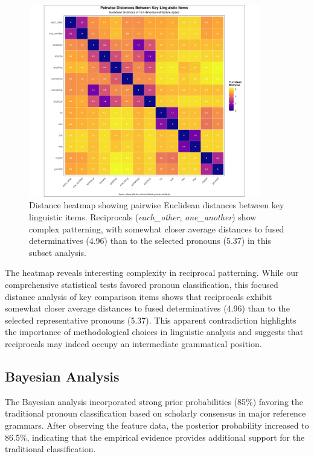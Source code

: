 \documentclass[12pt]{article}
\begin{document}
\begin{figure}[htbp]
\centering
\includegraphics[width=0.9\textwidth]{reciprocals_distance_heatmap.png}
\caption{Distance heatmap showing pairwise Euclidean distances between key linguistic items. Reciprocals (\textit{each\_other}, \textit{one\_another}) show complex patterning, with somewhat closer average distances to fused determinatives (4.96) than to the selected pronouns (5.37) in this subset analysis.}
\label{fig:heatmap}
\end{figure}

The heatmap reveals interesting complexity in reciprocal patterning. While our comprehensive statistical tests favored pronoun classification, this focused distance analysis of key comparison items shows that reciprocals exhibit somewhat closer average distances to fused determinatives (4.96) than to the selected representative pronouns (5.37). This apparent contradiction highlights the importance of methodological choices in linguistic analysis and suggests that reciprocals may indeed occupy an intermediate grammatical position.

\subsection{Bayesian Analysis}

The Bayesian analysis incorporated strong prior probabilities (85\%) favoring the traditional pronoun classification based on scholarly consensus in major reference grammars. After observing the feature data, the posterior probability increased to 86.5\%, indicating that the empirical evidence provides additional support for the traditional classification.
\end{document}
